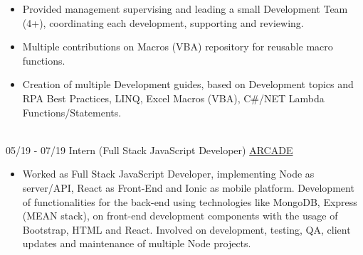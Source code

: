\documentclass[letterpaper]{twentysecondcv} %
\begin{document}
\begin{twenty}
{\begin{itemize}
\begin{itemize}
                    \item Provided management supervising and leading a small Development Team (4+), coordinating each development, supporting and reviewing.
        
                    \item Multiple contributions on Macros (VBA) repository for reusable macro functions.
                    
                    \item Creation of multiple Development guides, based on Development topics and RPA Best Practices, LINQ, Excel Macros (VBA), C\#/NET Lambda Functions/Statements.
                \end{itemize}
            \end{itemize}
        }
        \\
        \twentyitem
    	{05/19 - 07/19}
        {Intern (Full Stack JavaScript Developer)}
        { \href{https://arcader.life/}{ARCADE} }
        {
            \begin{itemize}
                \item Worked as Full Stack JavaScript Developer, implementing Node as server/API, React as Front-End and Ionic as mobile platform. Development of functionalities for the back-end using technologies like MongoDB, Express (MEAN stack), on front-end development components with the usage of Bootstrap, HTML and React. Involved on development, testing, QA, client updates and maintenance of multiple Node projects. 
            \end{itemize}
        }
        \\
\end{twenty}

\newpage
\sidebar %
\end{document}
